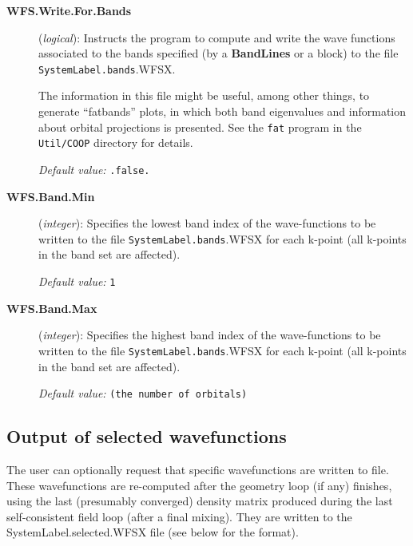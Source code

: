 \begin{description}

\item[\textbf{WFS.Write.For.Bands}] (\textit{logical}):
Instructs the program to compute and write the wave functions
associated to the bands specified (by a \textbf{BandLines} or a  block) to the file \texttt{SystemLabel.bands}.WFSX.

The information in this file might be useful, among other things, to
generate ``fatbands'' plots, in which both  band eigenvalues and
information about orbital projections is presented.
 See the
\texttt{fat} program in the \texttt{Util/COOP} directory for details.

\textit{Default value:} \texttt{.false.}

\item[\textbf{WFS.Band.Min}] (\textit{integer}):
Specifies the lowest band index of the wave-functions to be written to 
the file \texttt{SystemLabel.bands}.WFSX for each k-point (all k-points
in the band set are affected). 

\textit{Default value:} \texttt{1}

\item[\textbf{WFS.Band.Max}] (\textit{integer}):
Specifies the highest band index of the wave-functions to be written to 
the file \texttt{SystemLabel.bands}.WFSX for each k-point (all k-points
in the band set are affected).

\textit{Default value:} \texttt{(the number of orbitals)}

\end{description}


\subsection{Output of selected wavefunctions}
\label{sec:wf-output-user}

The user can optionally request that specific wavefunctions are
written to file. These wavefunctions are re-computed after the
geometry loop (if any) finishes, using the last (presumably converged)
density matrix produced during the last self-consistent field loop
(after a final mixing). They are written to the
SystemLabel.selected.WFSX file (see below for the format).

